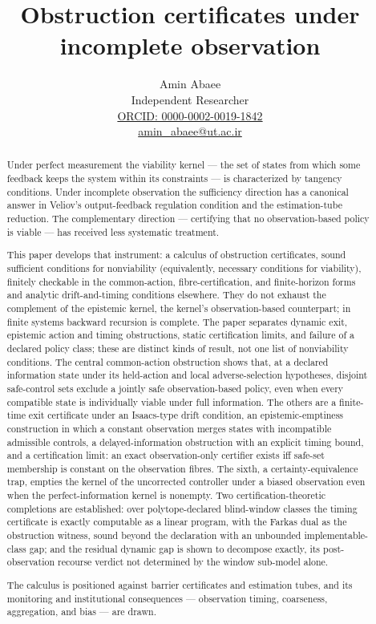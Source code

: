 \documentclass[10pt,twocolumn]{article}
\title{Obstruction certificates under incomplete observation}
\author{Amin Abaee\\[0.35em]
{\small Independent Researcher}\\[0.55em]
{\small\href{https://orcid.org/0000-0002-0019-1842}{ORCID: 0000-0002-0019-1842}}\\[0.3em]
{\small\href{mailto:amin\_abaee@ut.ac.ir}{amin\_abaee@ut.ac.ir}}}
\theoremstyle{definition}
\begin{document}
\maketitle

\begin{abstract}

Under perfect measurement the viability kernel --- the set of states
from which some feedback keeps the system within its constraints --- is
characterized by tangency conditions. Under incomplete observation the
sufficiency direction has a canonical answer in Veliov's
output-feedback regulation condition and the estimation-tube reduction.
The complementary direction --- certifying that no observation-based
policy is viable --- has received less systematic treatment.

This paper develops that instrument: a calculus of obstruction
certificates, sound sufficient conditions for nonviability (equivalently, necessary conditions for viability), finitely
checkable in the common-action, fibre-certification, and finite-horizon forms and analytic drift-and-timing conditions elsewhere. They do not exhaust the complement of the epistemic kernel, the kernel's observation-based counterpart; in finite systems backward recursion is complete. The paper separates dynamic exit, epistemic action and timing
obstructions, static certification limits, and failure of a declared
policy class; these are distinct kinds of result, not one list of
nonviability conditions. The central common-action obstruction shows that, at a declared
information state under its held-action and local adverse-selection
hypotheses, disjoint safe-control sets exclude a jointly safe
observation-based policy, even when every compatible state is
individually viable under full information. The others are a finite-time
exit certificate under an Isaacs-type drift condition, an
epistemic-emptiness construction in which a constant observation merges
states with incompatible admissible controls, a delayed-information
obstruction with an explicit timing bound, and a certification limit:
an exact observation-only certifier exists iff safe-set
membership is constant on the observation fibres. The sixth, a
certainty-equivalence trap, empties the kernel of the uncorrected controller under a biased
observation even when the perfect-information kernel is nonempty.
Two certification-theoretic completions are established: over polytope-declared
blind-window classes the timing certificate is exactly computable as a linear
program, with the Farkas dual as the obstruction witness, sound beyond the
declaration with an unbounded implementable-class gap; and the residual dynamic
gap is shown to decompose exactly, its post-observation recourse verdict not determined by the window sub-model
alone.

The calculus is positioned against barrier certificates and estimation
tubes, and its monitoring and institutional consequences ---
observation timing, coarseness, aggregation, and bias --- are drawn.

\end{abstract}
\end{document}
